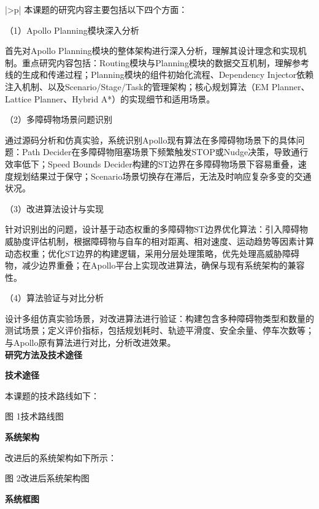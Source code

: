 \documentclass[a4paper,12pt]{article}
\begin{document}
\begin{longtable}{|>{\setlength{\parindent}{2em}}p{\dimexpr{}\arrayrulewidth}|}
本课题的研究内容主要包括以下四个方面：

（1）Apollo Planning模块深入分析

首先对Apollo Planning模块的整体架构进行深入分析，理解其设计理念和实现机制。重点研究内容包括：Routing模块与Planning模块的数据交互机制，理解参考线的生成和传递过程；Planning模块的组件初始化流程、Dependency Injector依赖注入机制、以及Scenario/Stage/Task的管理架构；核心规划算法（EM Planner、Lattice Planner、Hybrid A*）的实现细节和适用场景。

（2）多障碍物场景问题识别

通过源码分析和仿真实验，系统识别Apollo现有算法在多障碍物场景下的具体问题：Path Decider在多障碍物阻塞场景下频繁触发STOP或Nudge决策，导致通行效率低下；Speed Bounds Decider构建的ST边界在多障碍物场景下容易重叠，速度规划结果过于保守；Scenario场景切换存在滞后，无法及时响应复杂多变的交通状况。

（3）改进算法设计与实现

针对识别出的问题，设计基于动态权重的多障碍物ST边界优化算法：引入障碍物威胁度评估机制，根据障碍物与自车的相对距离、相对速度、运动趋势等因素计算动态权重；优化ST边界的构建逻辑，采用分层处理策略，优先处理高威胁障碍物，减少边界重叠；在Apollo平台上实现改进算法，确保与现有系统架构的兼容性。

（4）算法验证与对比分析

设计多组仿真实验场景，对改进算法进行验证：构建包含多种障碍物类型和数量的测试场景；定义评价指标，包括规划耗时、轨迹平滑度、安全余量、停车次数等；与Apollo原有算法进行对比，分析改进效果。
\\
{\bfseries 研究方法及技术途径}

{\bfseries 技术途径}

本课题的技术路线如下：

\begin{center}
\resizebox{0.85\linewidth}{!}{}

图 1\quad 技术路线图
\end{center}

{\bfseries 系统架构}

改进后的系统架构如下所示：

\begin{center}
\resizebox{0.85\linewidth}{!}{}

图 2\quad 改进后系统架构图
\end{center}

{\bfseries 系统框图}

\begin{center}
\resizebox{0.85\linewidth}{!}{}


\end{center}
\end{longtable}
\end{document}
